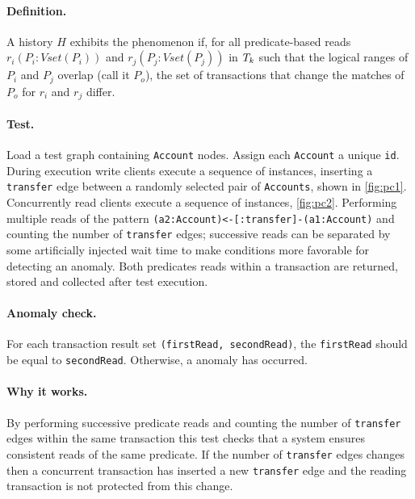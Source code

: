 \paragraph{Definition.}
A history $H$ exhibits the phenomenon  if, for all predicate-based reads $r_i(P_i : \textit{Vset}(P_i))$ and $r_j(P_j : \textit{Vset}(P_j))$ in $T_k$ such that the logical ranges of $P_i$ and $P_j$ overlap (call it $P_o$), the set of transactions that change the matches of $P_o$ for $r_i$ and $r_j$ differ.

\paragraph{Test.}
Load a test graph containing \texttt{Account} nodes. Assign each \texttt{Account}
a unique \texttt{id}. During execution write clients execute a sequence of
 instances, inserting a \texttt{transfer} edge between a
randomly selected pair of \texttt{Accounts}, shown in \autoref{fig:pc1}.
Concurrently read clients execute a sequence of 
instances, \autoref{fig:pc2}. Performing multiple reads of the pattern
\texttt{(a2:Account)<-[:transfer]-(a1:Account)} and counting the number of
\texttt{transfer} edges; successive reads can be separated by some artificially
injected wait time to make conditions more favorable for detecting an anomaly.
Both predicates reads within a  transaction are returned,
stored and collected after test execution.

\paragraph{Anomaly check.}
For each  transaction result set
\texttt{(firstRead, secondRead)}, the \texttt{firstRead} should be equal to
\texttt{secondRead}. Otherwise, a  anomaly has occurred.

\paragraph{Why it works.}
By performing successive predicate reads and counting the number of
\texttt{transfer} edges within the same transaction this test checks that a
system ensures consistent reads of the same predicate. If the number of
\texttt{transfer} edges changes then a concurrent transaction has inserted a new
\texttt{transfer} edge and the reading transaction is not protected from this
change.

